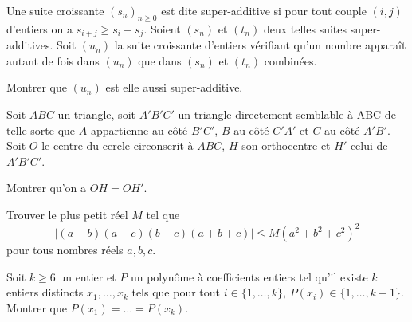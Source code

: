 \begin{exo}{}
\begin{center}
\end{center}
\end{exo}



\begin{exo}{}
Une suite croissante $(s_n) _ { n \geq 0}$ est dite super-additive si pour tout couple $(i,j)$ d'entiers on a $s_{i+j} \geq s_i + s_j$. Soient $(s_n)$ et $(t_n)$ deux telles suites super-additives. Soit $(u_n)$ la suite croissante d'entiers vérifiant qu'un nombre apparaît autant de fois dans $(u_n)$ que dans $(s_n)$ et $(t_n)$ combinées. 

Montrer que $(u_n)$ est elle aussi super-additive.
\end{exo}

\begin{exo}{}
Soit $ABC$ un triangle, soit $A'B'C'$ un triangle directement semblable \`a ABC de telle sorte que $A$ appartienne au c\^ot\'e $B'C'$, $B$ au c\^ot\'e $C'A'$ et $C$ au c\^ot\'e $A'B'$. Soit $O$ le centre du cercle circonscrit \`a $ABC$, $H$ son orthocentre et $H'$ celui de $A'B'C'$. 

Montrer qu'on a $OH=OH'$.
\end{exo}

\begin{exo}{} Trouver le plus petit réel $M$ tel que \[|(a-b)(a-c)(b-c)(a+b+c)| \leq M(a^2+b^2+c^2)^2\]
pour tous nombres réels $a,b,c$.
\end{exo}

\begin{exo}{} Soit $k\geq 6$ un entier  et $P$ un polynôme à coefficients entiers tel qu'il existe $k$ entiers distincts $x_1,\ldots,x_k$ tels que pour tout $i\in \{1,\ldots,k\}$, $P(x_i) \in \{1,\ldots,k-1\}$. Montrer que $P(x_1) = \ldots = P(x_k)$. 
\end{exo}

